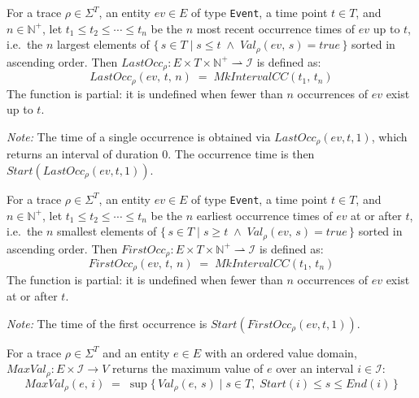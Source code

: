 \begin{definition}\label{def:last_occ}
    For a trace $\rho \in \Sigma^T$, an entity $ev \in E$ of type \texttt{Event}, a time point $t \in T$, and $n \in \mathbb{N}^+$,
    let $t_1 \leq t_2 \leq \cdots \leq t_n$ be the $n$ most recent occurrence times of $ev$ up to $t$, i.e.\ the $n$ largest elements of $\{\, s \in T \mid s \leq t \;\land\; \mathit{Val}_\rho(ev,\, s) = \mathit{true} \,\}$ sorted in ascending order.
    Then $\mathit{LastOcc}_\rho : E \times T \times \mathbb{N}^+ \rightharpoonup \mathcal{I}$ is defined as:
    \[
        \mathit{LastOcc}_\rho(ev,\, t,\, n) \;=\; \mathit{MkIntervalCC}(t_1,\, t_n)
    \]
    The function is partial: it is undefined when fewer than $n$ occurrences of $ev$ exist up to $t$.

    \textit{Note:} The time of a single occurrence is obtained via $\mathit{LastOcc}_\rho(ev, t, 1)$, which returns an interval of duration $0$. The occurrence time is then $\mathit{Start}(\mathit{LastOcc}_\rho(ev, t, 1))$.
\end{definition}

\begin{definition}\label{def:first_occ}
    For a trace $\rho \in \Sigma^T$, an entity $ev \in E$ of type \texttt{Event}, a time point $t \in T$, and $n \in \mathbb{N}^+$,
    let $t_1 \leq t_2 \leq \cdots \leq t_n$ be the $n$ earliest occurrence times of $ev$ at or after $t$, i.e.\ the $n$ smallest elements of $\{\, s \in T \mid s \geq t \;\land\; \mathit{Val}_\rho(ev,\, s) = \mathit{true} \,\}$ sorted in ascending order.
    Then $\mathit{FirstOcc}_\rho : E \times T \times \mathbb{N}^+ \rightharpoonup \mathcal{I}$ is defined as:
    \[
        \mathit{FirstOcc}_\rho(ev,\, t,\, n) \;=\; \mathit{MkIntervalCC}(t_1,\, t_n)
    \]
    The function is partial: it is undefined when fewer than $n$ occurrences of $ev$ exist at or after $t$.

    \textit{Note:} The time of the first occurrence is $\mathit{Start}(\mathit{FirstOcc}_\rho(ev, t, 1))$.
\end{definition}

\begin{definition}\label{def:max_val}
    For a trace $\rho \in \Sigma^T$ and an entity $e \in E$ with an ordered value domain,
    $\mathit{MaxVal}_\rho : E \times \mathcal{I} \rightarrow V$ returns the maximum value of $e$ over an interval $i \in \mathcal{I}$:
    \[
        \mathit{MaxVal}_\rho(e,\, i) \;=\; \sup\{\, \mathit{Val}_\rho(e,\, s) \mid s \in T,\; \mathit{Start}(i) \leq s \leq \mathit{End}(i) \,\}
    \]
\end{definition}

